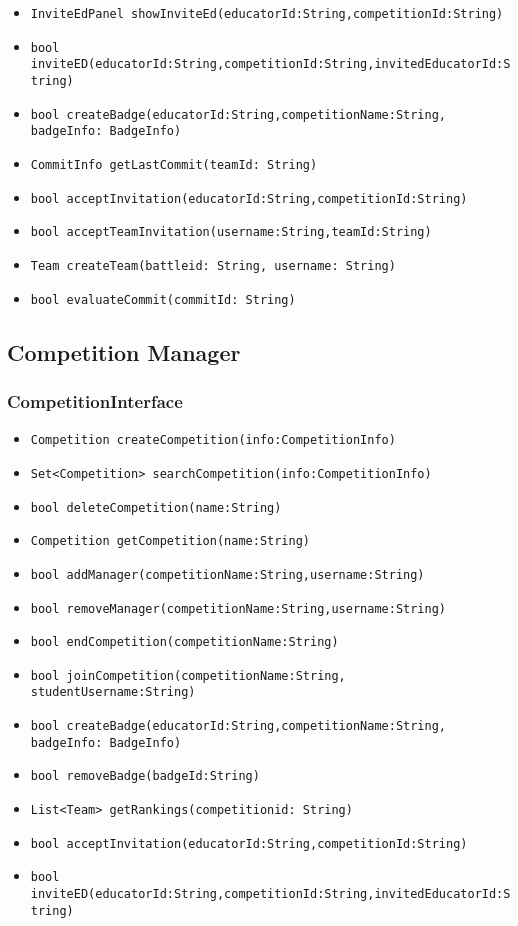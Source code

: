 \begin{itemize}
    \item \texttt{InviteEdPanel showInviteEd(educatorId:String,competitionId:String)}%
    \item \texttt{bool inviteED(educatorId:String,competitionId:String,invitedEducatorId:String)}%
    \item \texttt{bool createBadge(educatorId:String,competitionName:String, badgeInfo: BadgeInfo)}%
    \item \texttt{CommitInfo getLastCommit(teamId: String)}%
    \item \texttt{bool acceptInvitation(educatorId:String,competitionId:String)}%
    \item \texttt{bool acceptTeamInvitation(username:String,teamId:String)}%
    \item \texttt{Team createTeam(battleid: String, username: String)}%
    \item \texttt{bool evaluateCommit(commitId: String)}%
\end{itemize}

\subsection{Competition Manager}
\subsubsection{CompetitionInterface}
\begin{itemize}
    \item \texttt{Competition createCompetition(info:CompetitionInfo)}%
    \item \texttt{Set<Competition> searchCompetition(info:CompetitionInfo)}
    \item \texttt{bool deleteCompetition(name:String)}
    \item \texttt{Competition getCompetition(name:String)}%
    \item \texttt{bool addManager(competitionName:String,username:String)}%
    \item \texttt{bool removeManager(competitionName:String,username:String)}
    \item \texttt{bool endCompetition(competitionName:String)}
    \item \texttt{bool joinCompetition(competitionName:String, studentUsername:String)}%
    \item \texttt{bool createBadge(educatorId:String,competitionName:String, badgeInfo: BadgeInfo)}%
    \item \texttt{bool removeBadge(badgeId:String)}
    \item \texttt{List<Team> getRankings(competitionid: String)}
    \item \texttt{bool acceptInvitation(educatorId:String,competitionId:String)}%
    \item \texttt{bool inviteED(educatorId:String,competitionId:String,invitedEducatorId:String)}%
\end{itemize}

